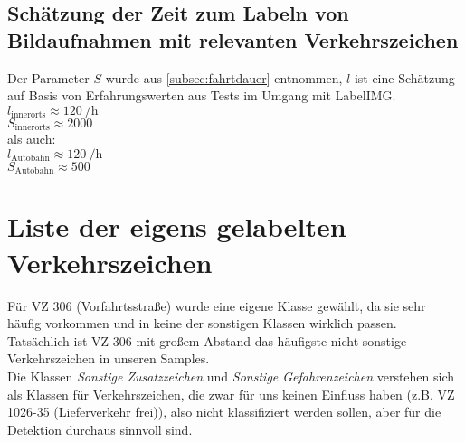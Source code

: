 \begin{appendix}
\subsection{Schätzung der Zeit zum Labeln von Bildaufnahmen mit relevanten Verkehrszeichen}
\label{subsec:labeln}
Der Parameter $S$ wurde aus \cref{subsec:fahrtdauer} entnommen, $l$ ist eine Schätzung auf Basis von Erfahrungswerten aus Tests im Umgang mit LabelIMG.\\
$l_\text{innerorts} \approx \SI{120}{\per\hour}$\\
$S_\text{innerorts} \approx 2000$\\\newline
als auch:\\
$l_\text{Autobahn} \approx \SI{120}{\per\hour}$\\
$S_\text{Autobahn} \approx 500$\\
\newpage
\section{Liste der eigens gelabelten Verkehrszeichen}
\label{sec:eigens_gelabelte_verkehrszeichen}

Für \gls{VZ} 306 (Vorfahrtsstraße) wurde eine eigene Klasse gewählt, da sie sehr häufig vorkommen und in keine der sonstigen Klassen wirklich passen. Tatsächlich ist \gls{VZ} 306 mit großem Abstand das häufigste nicht-sonstige Verkehrszeichen in unseren Samples.\\ 
Die Klassen \textit{Sonstige Zusatzzeichen} und \textit{Sonstige Gefahrenzeichen} verstehen sich als Klassen für Verkehrszeichen, die zwar für uns keinen Einfluss haben (z.B. \gls{VZ} 1026-35 (Lieferverkehr frei)), also nicht klassifiziert werden sollen, aber für die Detektion durchaus sinnvoll sind. \\


\end{appendix}
